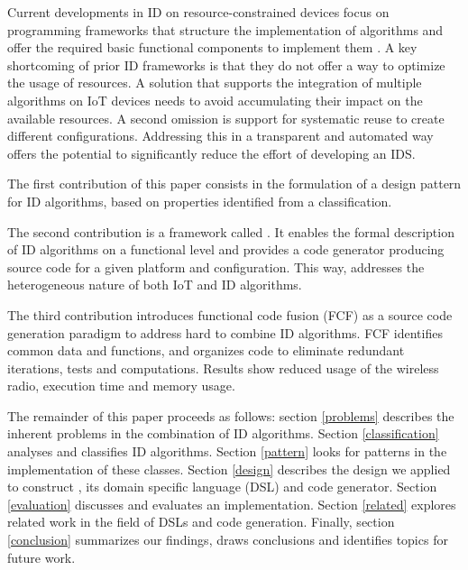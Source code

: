 \documentclass[3p,times,procedia]{elsarticle}
\begin{document}

Current developments in ID on resource-constrained devices focus on programming
frameworks that structure the implementation of algorithms \cite{valero2012di}
and offer the required basic functional components to implement them
\cite{krontiris2008lidea}. A key shortcoming of prior ID frameworks is that
they do not offer a way to optimize the usage of resources. A solution that
supports the integration of multiple algorithms on IoT devices needs to avoid
accumulating their impact on the available resources. A second omission is
support for systematic reuse to create different configurations. Addressing
this in a transparent and automated way offers the potential to significantly
reduce the effort of developing an IDS.



The first contribution of this paper consists in the formulation of a design
pattern for ID algorithms, based on properties identified from a classification.


The second contribution is a framework called \NAME. It enables the formal
description of ID algorithms on a functional level and provides a code
generator producing source code for a given platform and configuration. This
way, \NAME addresses the heterogeneous nature of both IoT and ID algorithms.


The third contribution introduces functional code fusion (FCF) as a source code
generation paradigm to address hard to combine ID algorithms. FCF identifies
common data and functions, and organizes code to eliminate redundant
iterations, tests and computations. Results show reduced usage of the wireless
radio, execution time and memory usage.


The remainder of this paper proceeds as follows: section \ref{problems}
describes the inherent problems in the combination of ID algorithms. Section
\ref{classification} analyses and classifies ID algorithms. Section
\ref{pattern} looks for patterns in the implementation of these classes.
Section \ref{design} describes the design we applied to construct \NAME, its
domain specific language (DSL) and code generator. Section \ref{evaluation}
discusses and evaluates an implementation. Section \ref{related} explores
related work in the field of DSLs and code generation. Finally, section
\ref{conclusion} summarizes our findings, draws conclusions and identifies
topics for future work.
\end{document}
